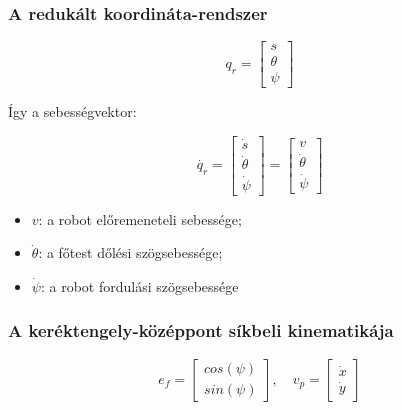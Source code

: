 \documentclass[12pt,a4paper]{report}
\begin{document}
	\subsubsection{A redukált koordináta-rendszer}
	
	\begin{equation}q_r = \begin{bmatrix} s \\ \theta \\ \psi \end{bmatrix}
	\end{equation}
	
	Így a sebességvektor:
	
	\begin{equation}
		\dot{q_r} = \begin{bmatrix} \dot{s} \\ \dot{\theta } \\ \dot{\psi } \end{bmatrix}
		= \begin{bmatrix} v \\ \dot{\theta } \\ \dot{\psi } \end{bmatrix}
	\end{equation}
	
	
	\begin{itemize}
		\item $v$: a robot előremeneteli sebessége;
		\item $\dot{\theta}$: a főtest dőlési szögsebessége;
		\item $\dot{\psi}$: a robot fordulási szögsebessége 
	\end{itemize}
	
	\newpage
	
	\subsubsection{A keréktengely-középpont síkbeli kinematikája}
	
	\begin{equation}
		e_f = \begin{bmatrix}
			cos(\psi) \\ sin(\psi)
		\end{bmatrix}, \quad
		v_p =
		\begin{bmatrix}
			\dot{x} \\ \dot{y}
		\end{bmatrix}
	\end{equation}
	
	
	
\end{document}
